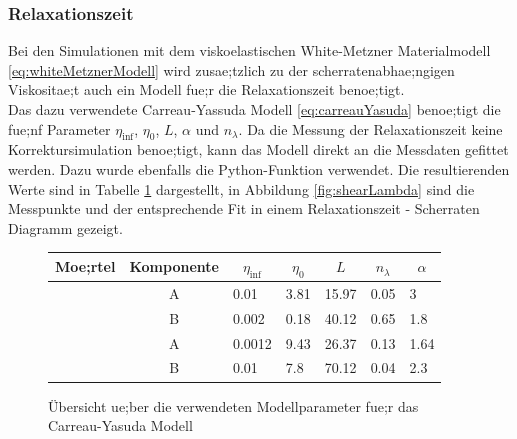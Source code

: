 \subsubsection{Relaxationszeit}
Bei den Simulationen mit dem viskoelastischen White-Metzner Materialmodell \eqref{eq:whiteMetznerModell} wird zusae;tzlich zu der scherratenabhae;ngigen Viskositae;t auch ein Modell fue;r die Relaxationszeit benoe;tigt.\\
Das dazu verwendete Carreau-Yassuda Modell \eqref{eq:carreauYasuda} benoe;tigt die fue;nf Parameter $\eta_{\inf}$, $\eta_0$, $L$, $\alpha$ und $n_{\lambda}$. Da die Messung der Relaxationszeit keine Korrektursimulation benoe;tigt, kann das Modell direkt an die Messdaten gefittet werden.
Dazu wurde ebenfalls die Python-Funktion  verwendet. Die resultierenden Werte sind in Tabelle \ref{fig:relaxParameter} dargestellt, in Abbildung \ref{fig:shearLambda} sind die Messpunkte und der entsprechende Fit in einem Relaxationszeit - Scherraten Diagramm gezeigt.
\begin{figure}
    \centering
    \begin{tabular}{l c l l l l l}
        \textbf{Moe;rtel} & 
        \textbf{Komponente} & 
        \multicolumn{1}{c}{$\eta_{\inf}$} & 
        \multicolumn{1}{c}{$\eta_0$} &
        \multicolumn{1}{c}{$L$} & 
        \multicolumn{1}{c}{$n_{\lambda}$} & 
        \multicolumn{1}{c}{$\alpha$} \\
        \hline
        \hline
        \multirow{2}{*}{\hit{}} & A & 0.01   & 3.81  & 15.97 & 0.05 & 3       \\ 
                                & B & 0.002  & 0.18  & 40.12 & 0.65 & 1.8     \\ 
        \hline
        \multirow{2}{*}{\re{}}  & A & 0.0012 & 9.43 & 26.37  & 0.13 & 1.64    \\ 
                                & B & 0.01   & 7.8  & 70.12  & 0.04 & 2.3         
    \end{tabular}
    \caption{Übersicht ue;ber die verwendeten Modellparameter fue;r das Carreau-Yasuda Modell}
    \label{fig:relaxParameter}
\end{figure}
%
